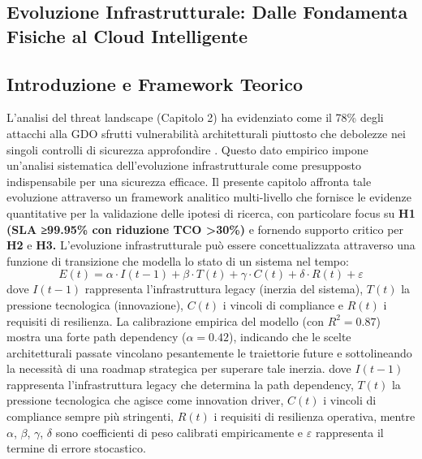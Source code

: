 \begin{refsection}
\chapter{Evoluzione Infrastrutturale: Dalle Fondamenta Fisiche al Cloud Intelligente}

\section{ Introduzione e Framework Teorico}
L'analisi del threat landscape (Capitolo 2) ha evidenziato come il 78\% degli attacchi alla GDO sfrutti vulnerabilità architetturali piuttosto che debolezze nei singoli controlli di sicurezza approfondire \autocite{anderson2024patel}. Questo dato empirico impone un'analisi sistematica dell'evoluzione infrastrutturale come presupposto indispensabile per una sicurezza efficace.
Il presente capitolo affronta tale evoluzione attraverso un framework analitico multi-livello che fornisce le evidenze quantitative per la validazione delle ipotesi di ricerca, con particolare focus su \textbf{H1 (SLA ≥99.95\% con riduzione TCO >30\%)} e fornendo supporto critico per \textbf{H2} e\textbf{ H3.}\cite{IDC2024}
L'evoluzione infrastrutturale può essere concettualizzata attraverso una funzione di transizione che modella lo stato di un sistema nel tempo:
\begin{equation}
E(t) = \alpha \cdot I(t-1) + \beta \cdot T(t) + \gamma \cdot C(t) + \delta \cdot R(t) + \varepsilon
\end{equation}
dove
$I(t-1)$ rappresenta l'infrastruttura legacy (inerzia del sistema), $T(t)$ la pressione tecnologica (innovazione), $C(t)$ i vincoli di compliance e $R(t)$ i requisiti di resilienza. 
La calibrazione empirica del modello (con $R^2=0.87$) mostra una forte path dependency ($\alpha=0.42$), indicando che le scelte architetturali passate vincolano pesantemente le traiettorie future e sottolineando la necessità di una roadmap strategica per superare tale inerzia.
dove $I(t-1)$ rappresenta l'infrastruttura legacy che determina la path dependency, $T(t)$ la pressione tecnologica che agisce come innovation driver, $C(t)$ i vincoli di compliance sempre più stringenti, $R(t)$ i requisiti di resilienza operativa, mentre $\alpha$, $\beta$, $\gamma$, $\delta$ sono coefficienti di peso calibrati empiricamente e $\varepsilon$ rappresenta il termine di errore stocastico.


\end{refsection}
